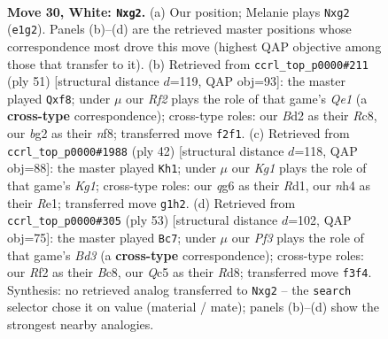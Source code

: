 \documentclass[11pt]{article}
\begin{document}
\clearpage

\begin{figure}[p]\centering
\begin{subfigure}{0.46\textwidth}\centering
\resizebox{\linewidth}{!}{%
\newchessgame
\chessboard[
  setfen={nr1r2k1/5pb1/p5qp/2Q1p3/1p2P2n/3P1P2/PP1B1Rb1/RN2N1K1 w - - 0 30},
  showmover=false,
  pgfstyle=straightmove, color=movearrow, markmove={e1-g2}
]}
\caption{}
\end{subfigure}\hfill
\begin{subfigure}{0.46\textwidth}\centering
\resizebox{\linewidth}{!}{%
\newchessgame
\chessboard[
  setfen={2r1qNk1/1p5p/1n4p1/p2Pp3/1np3P1/P1Nb3P/1P1Q4/2K1RB1R b - - 0 26},
  showmover=false,
  pgfstyle=straightmove, color=movearrow, markmove={e8-f8}
]}
\caption{}
\end{subfigure}
\\[4pt]
\begin{subfigure}{0.46\textwidth}\centering
\resizebox{\linewidth}{!}{%
\newchessgame
\chessboard[
  setfen={b2rr1k1/2q2pbp/1pp1n1p1/p3N3/2QPNP2/P5P1/1P4BP/3RR1K1 w - - 3 22},
  showmover=false,
  pgfstyle=straightmove, color=movearrow, markmove={g1-h1}
]}
\caption{}
\end{subfigure}\hfill
\begin{subfigure}{0.46\textwidth}\centering
\resizebox{\linewidth}{!}{%
\newchessgame
\chessboard[
  setfen={2brr1k1/1p3pp1/2pb1n1p/p4N1q/8/PP1BP2P/1BQ2PP1/3RR1K1 b - - 4 27},
  showmover=false,
  pgfstyle=straightmove, color=movearrow, markmove={d6-c7}
]}
\caption{}
\end{subfigure}
\caption{\textbf{Move 30, White: \texttt{Nxg2}.} (a) Our position; Melanie plays \texttt{Nxg2} (\texttt{e1g2}). Panels (b)--(d) are the retrieved master positions whose correspondence most drove this move (highest QAP objective among those that transfer to it). (b) Retrieved from \texttt{ccrl\_top\_p0000\#211} (ply 51) [structural distance $d$=119, QAP obj=93]: the master played \texttt{Qxf8}; under $\mu$ our \emph{Rf2} plays the role of that game's \emph{Qe1} (a \textbf{cross-type} correspondence); cross-type roles: our \emph{B}d2 as their \emph{R}c8, our \emph{b}g2 as their \emph{n}f8; transferred move \texttt{f2f1}. (c) Retrieved from \texttt{ccrl\_top\_p0000\#1988} (ply 42) [structural distance $d$=118, QAP obj=88]: the master played \texttt{Kh1}; under $\mu$ our \emph{Kg1} plays the role of that game's \emph{Kg1}; cross-type roles: our \emph{q}g6 as their \emph{R}d1, our \emph{n}h4 as their \emph{R}e1; transferred move \texttt{g1h2}. (d) Retrieved from \texttt{ccrl\_top\_p0000\#305} (ply 53) [structural distance $d$=102, QAP obj=75]: the master played \texttt{Bc7}; under $\mu$ our \emph{Pf3} plays the role of that game's \emph{Bd3} (a \textbf{cross-type} correspondence); cross-type roles: our \emph{R}f2 as their \emph{B}c8, our \emph{Q}c5 as their \emph{R}d8; transferred move \texttt{f3f4}. Synthesis: no retrieved analog transferred to \texttt{Nxg2} -- the \texttt{search} selector chose it on value (material / mate); panels (b)--(d) show the strongest nearby analogies.}
\label{fig:thought-m58}
\end{figure}
\end{document}
